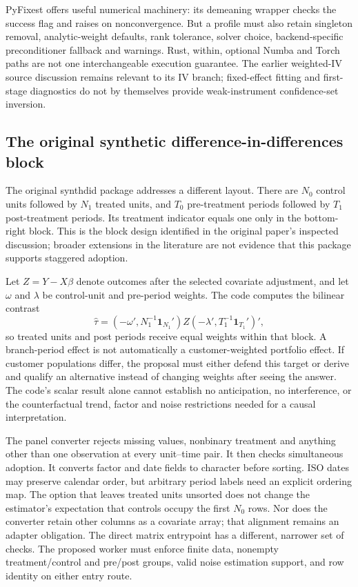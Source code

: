 PyFixest offers useful numerical machinery: its demeaning wrapper checks the
success flag and raises on nonconvergence. But a profile must also retain
singleton removal, analytic-weight defaults, rank tolerance, solver choice,
backend-specific preconditioner fallback and warnings. Rust, within, optional
Numba and Torch paths are not one interchangeable execution guarantee.
The earlier weighted-IV source discussion remains relevant to its IV branch;
fixed-effect fitting and first-stage diagnostics do not by themselves provide
weak-instrument confidence-set inversion.
\citep{exec23_pyfixest_reuse_source}

\subsection{The original synthetic difference-in-differences block}
\label{exec23:panel-sdid}
The original synthdid package addresses a different layout. There are $N_0$
control units followed by $N_1$ treated units, and $T_0$ pre-treatment periods
followed by $T_1$ post-treatment periods. Its treatment indicator equals one
only in the bottom-right block. This is the block design identified in the
original paper's inspected discussion; broader extensions in the literature
are not evidence that this package supports staggered adoption.
\citep{synthdid2021,exec23_synthdid_reuse_source}

Let $Z=Y-X\beta$ denote outcomes after the selected covariate adjustment, and
let $\omega$ and $\lambda$ be control-unit and pre-period weights. The code
computes the bilinear contrast
\begin{equation}
 \widehat\tau=
 (-\omega',N_1^{-1}\mathbf1_{N_1}')
 Z
 (-\lambda',T_1^{-1}\mathbf1_{T_1}')',
 \label{exec23:panel-contrast}
\end{equation}
so treated units and post periods receive equal weights within that block.
A branch-period effect is not automatically a customer-weighted portfolio
effect. If customer populations differ, the proposal must either defend this
target or derive and qualify an alternative instead of changing weights
after seeing the answer. The code's scalar result alone cannot establish
no anticipation, no interference, or the counterfactual trend, factor and
noise restrictions needed for a causal interpretation.
\citep{exec23_synthdid_reuse_source}

The panel converter rejects missing values, nonbinary treatment and anything
other than one observation at every unit--time pair. It then checks
simultaneous adoption. It converts factor and date fields to character before
sorting. ISO dates may preserve calendar order, but arbitrary period labels
need an explicit ordering map. The option that leaves treated units unsorted
does not change the estimator's expectation that controls occupy the first
$N_0$ rows. Nor does the converter retain other columns as a covariate array;
that alignment remains an adapter obligation. The direct matrix entrypoint
has a different, narrower set of checks. The proposed worker must enforce
finite data, nonempty treatment/control and pre/post groups, valid noise
estimation support, and row identity on either entry route.
\citep{exec23_synthdid_reuse_source}

